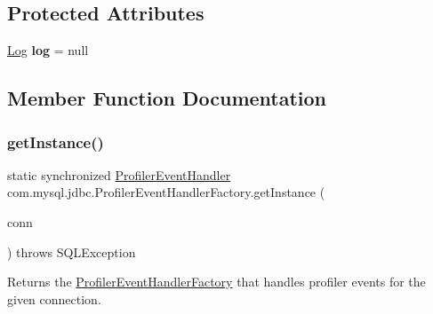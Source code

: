 \subsection*{Protected Attributes}
\begin{DoxyCompactItemize}
\item 
\mbox{\label{classcom_1_1mysql_1_1jdbc_1_1_profiler_event_handler_factory_a480abafe16f7a36840bbee5698495e12}} 
\mbox{\hyperlink{interfacecom_1_1mysql_1_1jdbc_1_1log_1_1_log}{Log}} {\bfseries log} = null
\end{DoxyCompactItemize}


\subsection{Member Function Documentation}
\mbox{\label{classcom_1_1mysql_1_1jdbc_1_1_profiler_event_handler_factory_a08c2982b1dba0c8012f879d1ea77ba69}} 
\subsubsection{\texorpdfstring{get\+Instance()}{getInstance()}}
{\footnotesize\ttfamily static synchronized \mbox{\hyperlink{interfacecom_1_1mysql_1_1jdbc_1_1profiler_1_1_profiler_event_handler}{Profiler\+Event\+Handler}} com.\+mysql.\+jdbc.\+Profiler\+Event\+Handler\+Factory.\+get\+Instance (\begin{DoxyParamCaption}\item[{\mbox{\hyperlink{interfacecom_1_1mysql_1_1jdbc_1_1_my_s_q_l_connection}{My\+S\+Q\+L\+Connection}}}]{conn }\end{DoxyParamCaption}) throws S\+Q\+L\+Exception\hspace{0.3cm}{\ttfamily [static]}}

Returns the \mbox{\hyperlink{classcom_1_1mysql_1_1jdbc_1_1_profiler_event_handler_factory}{Profiler\+Event\+Handler\+Factory}} that handles profiler events for the given connection.


